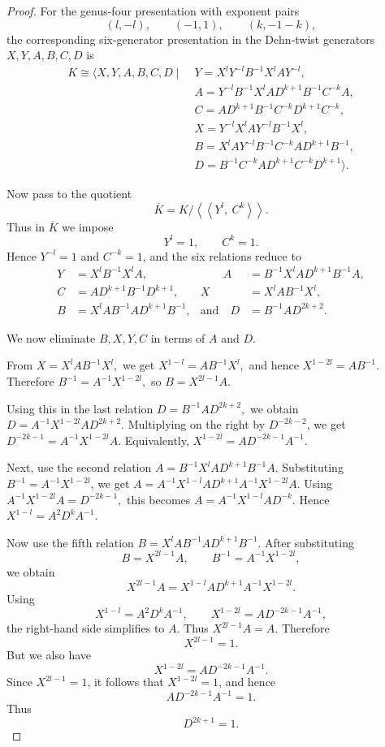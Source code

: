 \documentclass{article}
\begin{document}
\begin{proof}
For the genus-four presentation with exponent pairs
\[
(l,-l),\qquad (-1,1),\qquad (k,-1-k),
\]
the corresponding six-generator presentation in the Dehn-twist generators
\(X,Y,A,B,C,D\) is
\[
\begin{aligned}
K\cong
\langle X,Y,A,B,C,D \mid\;&
Y=X^lY^{-l}B^{-1}X^lAY^{-l},\\
&
A=Y^{-l}B^{-1}X^lAD^{k+1}B^{-1}C^{-k}A,\\
&
C=AD^{k+1}B^{-1}C^{-k}D^{k+1}C^{-k},\\
&
X=Y^{-l}X^lAY^{-l}B^{-1}X^l,\\
&
B=X^lAY^{-l}B^{-1}C^{-k}AD^{k+1}B^{-1},\\
&
D=B^{-1}C^{-k}AD^{k+1}C^{-k}D^{k+1}
\rangle .
\end{aligned}
\]

Now pass to the quotient
\[
\overline K
=
K/\left\langle\!\left\langle Y^l,\ C^k\right\rangle\!\right\rangle .
\]
Thus in \(\overline K\) we impose
\[
Y^l=1,\qquad C^k=1.
\]
Hence \(Y^{-l}=1\) and \(C^{-k}=1\), and the six relations reduce to
\[
\begin{aligned}
Y&=X^lB^{-1}X^lA,&\qquad
A&=B^{-1}X^lAD^{k+1}B^{-1}A,\\
C&=AD^{k+1}B^{-1}D^{k+1},&
X&=X^lAB^{-1}X^l,\\
B&=X^lAB^{-1}AD^{k+1}B^{-1},&
\text{and}\quad D&=B^{-1}AD^{2k+2}.
\end{aligned}
\]

We now eliminate \(B,X,Y,C\) in terms of \(A\) and \(D\).

From
\(
X=X^lAB^{-1}X^l,
\)
we get
\(
X^{1-l}=AB^{-1}X^l,
\)
and hence
\(
X^{1-2l}=AB^{-1}.
\)
Therefore
\(
B^{-1}=A^{-1}X^{1-2l},
\)
so
\(
B=X^{2l-1}A.
\)

Using this in the last relation
\(
D=B^{-1}AD^{2k+2},
\)
we obtain
\(
D=A^{-1}X^{1-2l}AD^{2k+2}.
\)
Multiplying on the right by \(D^{-2k-2}\), we get
\(
D^{-2k-1}=A^{-1}X^{1-2l}A.
\)
Equivalently,
\(
X^{1-2l}=AD^{-2k-1}A^{-1}.
\)

Next, use the second relation
\(
A=B^{-1}X^lAD^{k+1}B^{-1}A.
\)
Substituting \(B^{-1}=A^{-1}X^{1-2l}\), we get
\(
A
=
A^{-1}X^{1-l}AD^{k+1}A^{-1}X^{1-2l}A.
\)
Using
\(
A^{-1}X^{1-2l}A=D^{-2k-1},
\)
this becomes
\(
A=A^{-1}X^{1-l}AD^{-k}.
\)
Hence
\(
X^{1-l}=A^2D^kA^{-1}.
\)

Now use the fifth relation
\(
B=X^lAB^{-1}AD^{k+1}B^{-1}.
\)
After substituting
\[
B=X^{2l-1}A,
\qquad
B^{-1}=A^{-1}X^{1-2l},
\]
we obtain
\[
X^{2l-1}A
=
X^{1-l}AD^{k+1}A^{-1}X^{1-2l}.
\]
Using
\[
X^{1-l}=A^2D^kA^{-1},
\qquad
X^{1-2l}=AD^{-2k-1}A^{-1},
\]
the right-hand side simplifies to \(A\). Thus
\(
X^{2l-1}A=A.
\)
Therefore
\[
X^{2l-1}=1.
\]
But we also have
\[
X^{1-2l}=AD^{-2k-1}A^{-1}.
\]
Since \(X^{2l-1}=1\), it follows that \(X^{1-2l}=1\), and hence
\[
AD^{-2k-1}A^{-1}=1.
\]
Thus
\[
D^{2k+1}=1.
\]


\end{proof}
\end{document}
